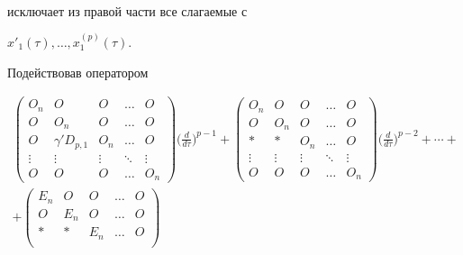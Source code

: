 \begin{pf}
\begin{multline*}
\end{multline*}


исключает из правой части все слагаемые с


$x'_1(\tau), \dotsc, x^{(p)}_1(\tau)$.


Подействовав оператором


\begin{multline*}


\begin{pmatrix}


O_n & O & O & \dotsc & O \\


O & O_n & O & \dotsc & O\\


O & \gamma'D_{p,1} & O_n & \dotsc & O\\


\vdots & \vdots & \vdots & \ddots & \vdots\\


O & O & O & \dotsc & O_n 


\end{pmatrix}


\bigg(\frac{d}{d\tau}\bigg)^{p-1}+


\begin{pmatrix}


O_n & O & O & \dotsc & O \\


O & O_n & O & \dotsc & O \\


\ast & * & O_n & \dotsc & O\\


\vdots & \vdots & \vdots & \ddots & \vdots\\


O & O & O & \dotsc & O_n 


\end{pmatrix}


\bigg(\frac{d}{d\tau}\bigg)^{p-2}


+ \dotsb + \\


%


+


\begin{pmatrix}


E_n & O & O & \dotsc & O\\


O & E_n & O & \dotsc & O\\


\ast & * & E_n & \dotsc & O\\



\end{pmatrix}
\end{multline*}
\end{pf}
